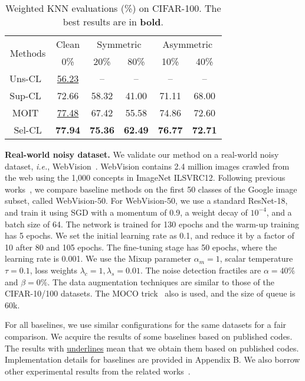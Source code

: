 \documentclass[10pt,twocolumn,letterpaper]{article}
\newcommand{\myPara}[1]{\vspace{.05in}\noindent\textbf{#1}}
\begin{document}
\begin{table}		
	\caption{Weighted KNN evaluations (\%) on CIFAR-100. The best results are in \textbf{bold}.}
	\centering
	\small
	\begin{tabular}{c|c|c|c|c|c}
		\hline \multirow{2}{*}{Methods} & Clean &\multicolumn{2}{c}{ Symmetric} & \multicolumn{2}{|c}{Asymmetric} \\\cline{2-6}
		& 0\% & 20\% & 80\% & 10\% & 40\% \\
		\hline
		Uns-CL~\cite{chen2020simple} & \underline{56.23} & -- & -- & -- & -- \\
		Sup-CL~\cite{Khosla2020} & 72.66 & 58.32 & 41.00 & 71.11 & 68.00 \\
		MOIT~\cite{Ortego2021} & \underline{77.48} & 67.42 & 55.58 & 74.86 & 72.60 \\
		Sel-CL & \textbf{77.94} & \textbf{75.36} & \textbf{62.49} & \textbf{76.77} & \textbf{72.71} \\				
		\hline
	\end{tabular}
	\label{knn}
	\vspace{-6pt}
\end{table}

\myPara{Real-world noisy dataset.} We validate our method on a real-world noisy dataset, \textit{i.e.}, WebVision~\cite{abs_1708_02862}. WebVision contains 2.4 million images crawled from the web using the 1,000 concepts in ImageNet ILSVRC12. Following previous works~\cite{LiSH20,Ortego2021}, we compare baseline methods on the first 50 classes of the Google image subset, called WebVision-50. For WebVision-50, we use a standard ResNet-18, and train it using SGD with a momentum of 0.9, a weight decay of $10^{-4}$, and a batch size of 64. The network is trained for 130 epochs and the warm-up training has 5 epochs. We set the initial learning rate as 0.1, and reduce it by a factor of 10 after 80 and 105 epochs. The fine-tuning stage has 50 epochs, where the learning rate is 0.001. We use the Mixup parameter $\alpha_m=1$, scalar temperature $\tau=0.1$, loss weights $\lambda_c=1,\lambda_s=0.01$. The noise detection fractiles are  $\alpha=40\%$ and $\beta=0\%$. The data augmentation techniques are similar to those of the CIFAR-10/100 datasets. The MOCO trick~\cite{He0WXG20} also is used, and the size of queue is 60k.

For all baselines, we use similar configurations for the same datasets for a fair comparison. We acquire the results of some baselines based on published codes. The results with \underline{underlines} mean that we obtain them based on published codes. Implementation details for baselines are provided in Appendix B. We also borrow other experimental results from the related works~\cite{LiSH20,Zheltonozhskii2021,LiuNRF20, Zhi2021ICCV,Ortego2021icpr,Ortego2021}.
\end{document}
